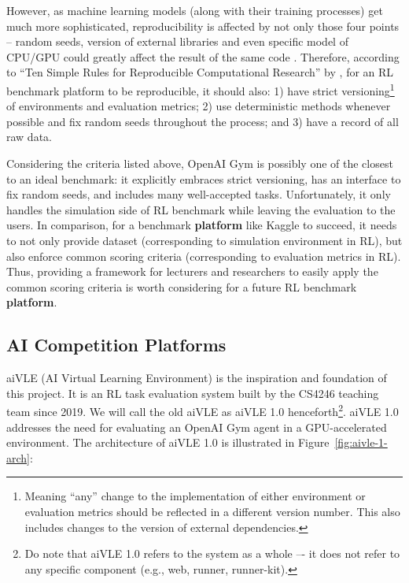 However, as machine learning models (along with their training processes) get much more sophisticated, reproducibility is affected by not only those four points – random seeds, version of external libraries and even specific model of CPU/GPU could greatly affect the result of the same code \parencite{RN21}. Therefore, according to “Ten Simple Rules for Reproducible Computational Research” by \parencite{RN22}, for an RL benchmark platform to be reproducible, it should also: 1) have strict versioning\footnote{Meaning “any” change to the implementation of either environment or evaluation metrics should be reflected in a different version number. This also includes changes to the version of external dependencies.} of environments and evaluation metrics; 2) use deterministic methods whenever possible and fix random seeds throughout the process; and 3) have a record of all raw data.

Considering the criteria listed above, OpenAI Gym\parencite{openai-gym} is possibly one of the closest to an ideal benchmark: it explicitly embraces strict versioning, has an interface to fix random seeds, and includes many well-accepted tasks. Unfortunately, it only handles the simulation side of RL benchmark while leaving the evaluation to the users. In comparison, for a benchmark \textbf{platform} like Kaggle to succeed, it needs to not only provide dataset (corresponding to simulation environment in RL), but also enforce common scoring criteria (corresponding to evaluation metrics in RL). Thus, providing a framework for lecturers and researchers to easily apply the common scoring criteria is worth considering for a future RL benchmark \textbf{platform}.

\subsection{AI Competition Platforms}
\label{ch:literature-review-related-work-ai-competition-platforms}
aiVLE (AI Virtual Learning Environment) is the inspiration and foundation of this project. It is an RL task evaluation system built by the CS4246 teaching team since 2019. We will call the old aiVLE as aiVLE 1.0 henceforth\footnote{Do note that aiVLE 1.0 refers to the system as a whole –- it does not refer to any specific component (e.g., web, runner, runner-kit).}. aiVLE 1.0 addresses the need for evaluating an OpenAI Gym agent in a GPU-accelerated environment. The architecture of aiVLE 1.0 is illustrated in Figure~\ref{fig:aivle-1-arch}:

